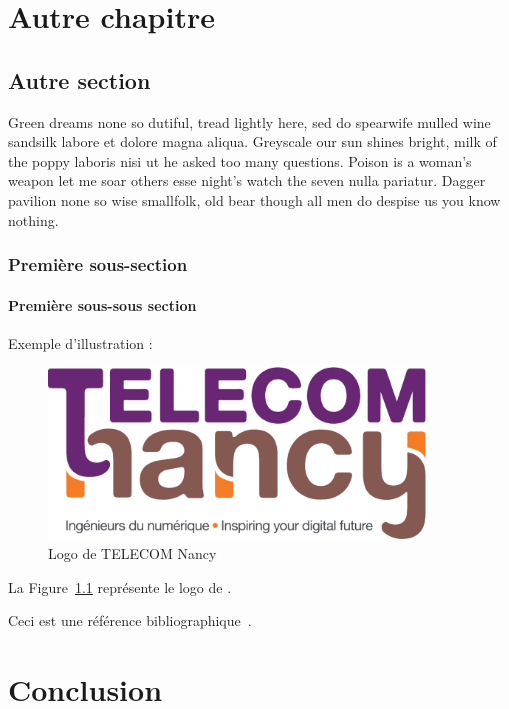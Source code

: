 \documentclass[pidr]{tnreport}
\begin{document}
\chapter{Autre chapitre}

\section{Autre section}

Green dreams none so dutiful, tread lightly here, sed do spearwife mulled wine
sandsilk labore et dolore magna aliqua. Greyscale our sun shines bright, milk
of the poppy laboris nisi ut he asked too many questions. Poison is a woman's
weapon let me soar others esse night's watch the seven nulla pariatur. Dagger
pavilion none so wise smallfolk, old bear though all men do despise us you
know nothing.


\subsection{Première sous-section}

\subsubsection{Première sous-sous section}

Exemple d'illustration :

\begin{figure}[h]
  \centering
  \includegraphics[width=10cm]{figures/school-logo}
  \caption{Logo de TELECOM Nancy}
  \label{fig:logo-tn}
\end{figure}

La Figure~\ref{fig:logo-tn} représente le logo de \reportSchool{}.

Ceci est une référence bibliographique~\cite{GOT4}.

\cleardoublepage

\chapter{Conclusion}
\end{document}
